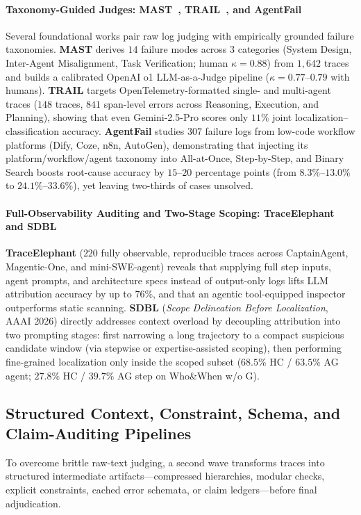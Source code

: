 \paragraph{Taxonomy-Guided Judges: MAST~\citep{cemri2025mast}, TRAIL~\citep{deshpande2025trail}, and AgentFail~\citep{ma2025agentfail}}
Several foundational works pair raw log judging with empirically grounded failure taxonomies. \textbf{MAST} derives $14$ failure modes across $3$ categories (System Design, Inter-Agent Misalignment, Task Verification; human $\kappa=0.88$) from $1{,}642$ traces and builds a calibrated OpenAI o1 LLM-as-a-Judge pipeline ($\kappa=0.77$--$0.79$ with humans). \textbf{TRAIL} targets OpenTelemetry-formatted single- and multi-agent traces ($148$ traces, $841$ span-level errors across Reasoning, Execution, and Planning), showing that even Gemini-2.5-Pro scores only $11\%$ joint localization--classification accuracy. \textbf{AgentFail} studies $307$ failure logs from low-code workflow platforms (Dify, Coze, n8n, AutoGen), demonstrating that injecting its platform/workflow/agent taxonomy into All-at-Once, Step-by-Step, and Binary Search boosts root-cause accuracy by $15$--$20$ percentage points (from $8.3\%$--$13.0\%$ to $24.1\%$--$33.6\%$), yet leaving two-thirds of cases unsolved.

\paragraph{Full-Observability Auditing and Two-Stage Scoping: TraceElephant~\citep{chen2026traceelephant} and SDBL~\citep{sun2026sdbl}\,\webtag}
\textbf{TraceElephant} ($220$ fully observable, reproducible traces across CaptainAgent, Magentic-One, and mini-SWE-agent) reveals that supplying full step inputs, agent prompts, and architecture specs instead of output-only logs lifts LLM attribution accuracy by up to $76\%$, and that an agentic tool-equipped inspector outperforms static scanning. \textbf{SDBL} (\emph{Scope Delineation Before Localization}, AAAI 2026) directly addresses context overload by decoupling attribution into two prompting stages: first narrowing a long trajectory to a compact suspicious candidate window (via stepwise or expertise-assisted scoping), then performing fine-grained localization only inside the scoped subset ($68.5\%$ HC / $63.5\%$ AG agent; $27.8\%$ HC / $39.7\%$ AG step on Who\&When w/o G).

\subsection{Structured Context, Constraint, Schema, and Claim-Auditing Pipelines}
To overcome brittle raw-text judging, a second wave transforms traces into structured intermediate artifacts---compressed hierarchies, modular checks, explicit constraints, cached error schemata, or claim ledgers---before final adjudication.

